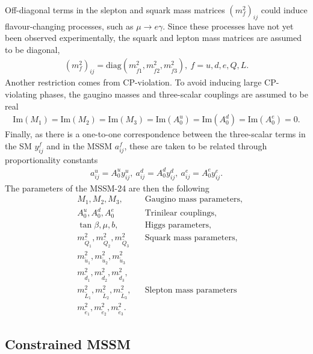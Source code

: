 \documentclass[twoside,english]{uiofysmaster}
\begin{document}
{Off-diagonal terms in the slepton and squark mass matrices $(m_f^2)_{ij}$ could induce flavour-changing processes, such as $\mu \rightarrow e \gamma$. Since these processes have not yet been observed experimentally, the squark and lepton mass matrices are assumed to be diagonal,
\begin{align}
(m_f^2)_{ij} = \text{diag}(m_{\widetilde{f}1}^2, m_{\widetilde{f}2}^2, m_{\widetilde{f}3}^2), ~f = u, d, e, Q, L.
\end{align}
Another restriction comes from CP-violation. To avoid inducing large CP-violating phases, the gaugino masses and three-scalar couplings are assumed to be real
\begin{align}
\text{Im}(M_1) = \text{Im}(M_2) = \text{Im} (M_3) = \text{Im} (A_0^u) = \text{Im} (A_0^d) = \text{Im} (A_0^e) = 0.
\end{align}
Finally, as there is a one-to-one correspondence between the three-scalar terms in the SM $y_{ij}^f$ and in the MSSM $a^f_{ij}$, these are taken to be related through proportionality constants
\begin{align}
a^u_{ij} = A_0^uy_{ij}^u, ~a^d_{ij} = A_0^dy_{ij}^d, ~a^e_{ij} = A_0^ey_{ij}^e.
\end{align}
 The parameters of the MSSM-24 are then the following
\begin{align}
&M_1, M_2, M_3, && \text{Gaugino mass parameters,} \nonumber \\
&A_0^u, A_0^d, A_0^e && \text{Trinilear couplings,} \nonumber\\
&\tan \beta, \mu, b, && \text{Higgs parameters,} \nonumber\\
& m_{\widetilde{Q}_1}^2, m_{\widetilde{Q}_2}^2, m_{\widetilde{Q}_3}^2 && \text{Squark mass parameters,}\nonumber\\
& m_{\widetilde{u}_1}^2, m_{\widetilde{u}_2}^2, m_{\widetilde{u}_3}^2\nonumber\\
&m_{\widetilde{d}_1}^2, m_{\widetilde{d}_2}^2, m_{\widetilde{d}_3}^2,\nonumber\\
& m_{\widetilde{L}_1}^2, m_{\widetilde{L}_2}^2, m_{\widetilde{L}_3}^2, &&\text{Slepton mass parameters}\nonumber\\
& m_{\widetilde{e}_1}^2, m_{\widetilde{e}_2}^2, m_{\widetilde{e}_3}^2.\nonumber
\end{align}

\subsection{Constrained MSSM}\label{Sec:: physics back : CMSSM}

}
\end{document}
